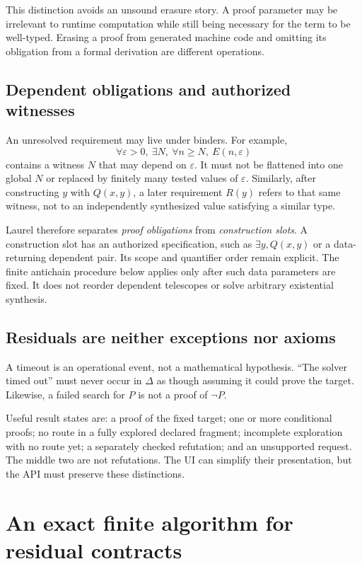 \documentclass[11pt,a4paper]{article}
\theoremstyle{definition}
\theoremstyle{remark}
\begin{document}
This distinction avoids an unsound erasure story. A proof parameter may be irrelevant to runtime computation while still being necessary for the term to be well-typed. Erasing a proof from generated machine code and omitting its obligation from a formal derivation are different operations.

\subsection{Dependent obligations and authorized witnesses}
An unresolved requirement may live under binders. For example,
\[
 \forall \varepsilon>0,\ \exists N,\ \forall n\ge N,\ E(n,\varepsilon)
\]
contains a witness $N$ that may depend on $\varepsilon$. It must not be flattened into one global $N$ or replaced by finitely many tested values of $\varepsilon$. Similarly, after constructing $y$ with $Q(x,y)$, a later requirement $R(y)$ refers to that same witness, not to an independently synthesized value satisfying a similar type.

Laurel therefore separates \emph{proof obligations} from \emph{construction slots}. A construction slot has an authorized specification, such as $\exists y, Q(x,y)$ or a data-returning dependent pair. Its scope and quantifier order remain explicit. The finite antichain procedure below applies only after such data parameters are fixed. It does not reorder dependent telescopes or solve arbitrary existential synthesis.

\subsection{Residuals are neither exceptions nor axioms}
A timeout is an operational event, not a mathematical hypothesis. ``The solver timed out'' must never occur in $\Delta$ as though assuming it could prove the target. Likewise, a failed search for $P$ is not a proof of $\neg P$.

Useful result states are: a proof of the fixed target; one or more conditional proofs; no route in a fully explored declared fragment; incomplete exploration with no route yet; a separately checked refutation; and an unsupported request. The middle two are not refutations. The UI can simplify their presentation, but the API must preserve these distinctions.

\section{An exact finite algorithm for residual contracts}\label{sec:antichain}
\end{document}
